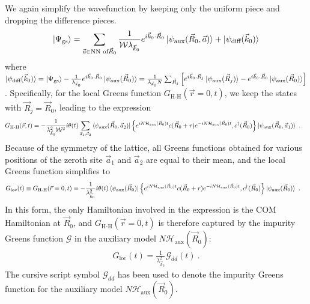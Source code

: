 \documentclass{report}
\numberwithin{equation}{section}
\begin{document}
We again simplify the wavefunction by keeping only the uniform piece and dropping the difference pieces.
\begin{equation}\begin{aligned}
	\ket{\Psi_\text{gs}} = \sum_{\vec a \in \text{NN of}\vec R_0}\frac{1}{\mathcal{W}\lambda_{\vec k_0}} e^{i\vec{k}_0\cdot\vec{R}_0} \ket{\psi_\text{aux}(\vec R_0, \vec a)} + \ket{\psi_\text{diff}(\vec k_0)}
\end{aligned}\end{equation}
where \(\ket{\psi_\text{diff}(\vec k_0)} = \ket{\Psi_\text{gs}} - \frac{1}{\lambda_{\vec k_0}} e^{i\vec{k}_0\cdot\vec{R}_0} \ket{\psi_\text{aux}(\vec R_0)} = \frac{1}{\lambda_{\vec k_0} N}\sum_{\vec R_j} \left[e^{i \vec{k}_0\cdot\vec{R}_j} \ket{\psi_\text{aux}(\vec R_j)} - e^{i\vec{k}_0\cdot\vec{R}_0} \ket{\psi_\text{aux}(\vec R_0)}\right]\).
Specifically, for the local Greens function \(G_\text{H-H}(\vec r=0, t)\), we keep the states with \(\vec R_j = \vec R_0\), leading to the expression
\begin{equation}\begin{aligned}\label{greens_func_approx}
	G_\text{H-H}(\vec r, t) &= -\frac{1}{\lambda_{\vec k_0}^2 \mathcal{W}^2}i\theta(t) \sum_{\vec a_1, \vec a_2}\braket{\psi_\text{aux}(\vec R_0, \vec a_2) | \left\{ e^{i N \mathcal{H}_\text{aux}(\vec R_0) t}c(\vec R_0 + r)e^{-i N \mathcal{H}_\text{aux}(\vec R_0) t}, c^\dagger(\vec R_0) \right\} | \psi_\text{aux}(\vec R_0, \vec a_1)}~.
\end{aligned}\end{equation}
Because of the symmetry of the lattice, all Greens functions obtained for various positions of the zeroth site \(\vec a_1\) and \(\vec a_2\) are equal to their mean, and the local Greens function simplifies to
\begin{equation}\begin{aligned}
	G_\text{loc}(t) \equiv G_\text{H-H}(\vec r=0, t) &= -\frac{1}{\lambda_{\vec k_0}^2 }i\theta(t) \braket{\psi_\text{aux}(\vec R_0) | \left\{ e^{i N \mathcal{H}_\text{aux}(\vec R_0) t}c(\vec R_0 + r)e^{-i N \mathcal{H}_\text{aux}(\vec R_0) t}, c^\dagger(\vec R_0) \right\} | \psi_\text{aux}(\vec R_0)}~.
\end{aligned}\end{equation}
In this form, the only Hamiltonian involved in the expression is the COM Hamiltonian at \(\vec R_0\), and \(G_\text{H-H}(\vec r=0, t)\) is therefore captured by the impurity Greens function \(\mathcal{G}\) in the auxiliary model \(N \mathcal{H}_\text{aux}(\vec R_0)\):
\begin{equation}\begin{aligned}
	\label{greens_func_relation}
	G_\text{loc}(t) = \frac{1}{\lambda_{\vec k_0}^2}\mathcal{G}_{dd}(t)~.
\end{aligned}\end{equation}
The cursive script symbol \(\mathcal{G}_{dd}\) has been used to denote the impurity Greens function for the auxiliary model \(N \mathcal{H}_\text{aux}(\vec R_0)\).
\end{document}
